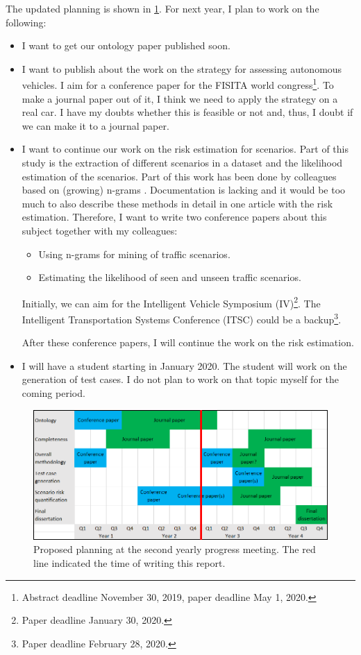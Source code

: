 \documentclass[10pt,final,a4paper,oneside,onecolumn]{article}
\begin{document}
The updated planning is shown in \cref{fig:planning}. For next year, I plan to work on the following:
\begin{itemize}
	\item I want to get our ontology paper published soon.
	
	\item I want to publish about the work on the strategy for assessing autonomous vehicles. I aim for a conference paper for the FISITA world congress\footnote{Abstract deadline November 30, 2019, paper deadline May 1, 2020.}. To make a journal paper out of it, I think we need to apply the strategy on a real car. I have my doubts whether this is feasible or not and, thus, I doubt if we can make it to a journal paper.
	
	\item I want to continue our work on the risk estimation for scenarios. Part of this study is the extraction of different scenarios in a dataset and the likelihood estimation of the scenarios. Part of this work has been done by colleagues based on (growing) n-grams \cite{kneser1995improved}. Documentation is lacking and it would be too much to also describe these methods in detail in one article with the risk estimation. Therefore, I want to write two conference papers about this subject together with my colleagues:
	\begin{itemize}
		\item Using n-grams for mining of traffic scenarios.
		\item Estimating the likelihood of seen and unseen traffic scenarios.
	\end{itemize}
	Initially, we can aim for the Intelligent Vehicle Symposium (IV)\footnote{Paper deadline January 30, 2020.}. The Intelligent Transportation Systems Conference (ITSC) could be a backup\footnote{Paper deadline February 28, 2020.}.
	
	After these conference papers, I will continue the work on the risk estimation.
	
	\item I will have a student starting in January 2020. The student will work on the generation of test cases. I do not plan to work on that topic myself for the coming period.
\end{itemize}

\begin{figure}
	\centering
	\includegraphics[width=\linewidth]{planning.png}
	\caption{Proposed planning at the second yearly progress meeting. The red line indicated the time of writing this report.}
	\label{fig:planning}
\end{figure}
\end{document}
